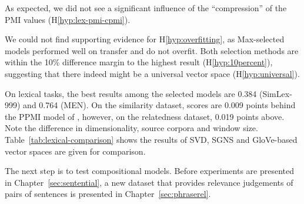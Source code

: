 As expected, we did not see a significant influence of the ``compression'' of the PMI values (H\ref{hyp:lex-pmi-cpmi}).

We could not find supporting evidence for H\ref{hyp:overfitting}, as Max-selected models performed well on transfer and do not overfit. Both selection methods are within the 10\% difference margin to the highest result (H\ref{hyp:10percent}), suggesting that there indeed might be a universal vector space (H\ref{hyp:universal}).


On lexical tasks, the best results among the selected models are 0.384 (SimLex-999) and 0.764 (MEN). On the similarity dataset, scores are 0.009 points behind the PPMI model of , however, on the relatedness dataset, 0.019 points above. Note the difference in dimensionality, source corpora and window size. Table~\ref{tab:lexical-comparison} shows the results of SVD, SGNS and GloVe-based vector spaces are given for comparison.

The next step is to test compositional models. Before experiments are presented in Chapter~\ref{sec:sentential}, a new dataset that provides relevance judgements of pairs of sentences is presented in Chapter~\ref{sec:phraserel}.

